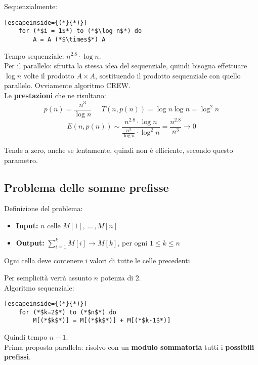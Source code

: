 Sequenzialmente: 
\begin{lstlisting}[escapeinside={(*}{*)}]
	for (*$i = 1$*) to (*$\log n$*) do
		A = A (*$\times$*) A 
\end{lstlisting}

Tempo sequenziale: $n^{2.8} \cdot \log n$.\\

Per il parallelo: sfrutta la stessa idea del sequenziale, quindi bisogna effettuare $\log n$ volte il prodotto $A \times A$, sostituendo il prodotto sequenziale con quello parallelo. Ovviamente algoritmo CREW.\\

Le \textbf{prestazioni} che ne risultano: 
$$ p(n) = \frac{n^3}{\log n} \;\;\;\;\; T(n, p(n)) = \log n \log n = \log^2 n $$
$$ E (n, p(n)) \sim \frac{n^{2.8} \cdot \log n}{\frac{n^3}{\log n} \cdot \log^2 n} = \frac{n^{2.8}}{n^3} \rightarrow 0 $$

Tende a zero, anche se lentamente, quindi non è efficiente, secondo questo parametro.\\

\newpage

\subsection{Problema delle somme prefisse}

Definizione del problema:
\begin{itemize}
	\item \textbf{Input:} $n$ celle $M[1], \, ... \, , M[n]$
	\item \textbf{Output:} $\sum_{i=1}^k M[i] \rightarrow M[k]$, per ogni $1 \leq k \leq n$
\end{itemize}
Ogni cella deve contenere i valori di tutte le celle precedenti

Per semplicità verrà assunto $n$ potenza di 2.\\

Algoritmo sequenziale: 
\begin{lstlisting}[escapeinside={(*}{*)}]
	for (*$k=2$*) to (*$n$*) do
		M[(*$k$*)] = M[(*$k$*)] + M[(*$k-1$*)]
\end{lstlisting}

Quindi tempo $n-1$.\\

Prima proposta parallela: risolvo con un \textbf{modulo sommatoria} tutti i \textbf{possibili prefissi}.\\

